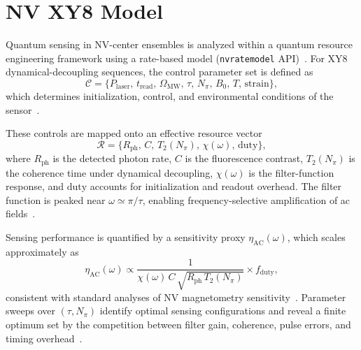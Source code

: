 \section{NV XY8 Model}

Quantum sensing in NV-center ensembles is analyzed within a quantum resource engineering framework using a rate-based model (\texttt{nvratemodel} API)~\cite{NVRateModel2023,Degen2017,Barry2020}. For XY8 dynamical-decoupling sequences, the control parameter set is defined as
\begin{equation}
\mathcal{C} = \{P_{\mathrm{laser}},\, t_{\mathrm{read}},\, \Omega_{\mathrm{MW}},\, \tau,\, N_{\pi},\, B_0,\, T,\, \mathrm{strain}\},
\end{equation}
which determines initialization, control, and environmental conditions of the sensor~\cite{Casola2018}.

These controls are mapped onto an effective resource vector
\begin{equation}
\mathcal{R} = \{R_{\mathrm{ph}},\, C,\, T_2(N_{\pi}),\, \chi(\omega),\, \mathrm{duty}\},
\end{equation}
where $R_{\mathrm{ph}}$ is the detected photon rate, $C$ is the fluorescence contrast, $T_2(N_{\pi})$ is the coherence time under dynamical decoupling, $\chi(\omega)$ is the filter-function response, and $\mathrm{duty}$ accounts for initialization and readout overhead. The filter function is peaked near $\omega \simeq \pi/\tau$, enabling frequency-selective amplification of ac fields~\cite{Cywinski2008}.

Sensing performance is quantified by a sensitivity proxy $\eta_{\mathrm{AC}}(\omega)$, which scales approximately as
\begin{equation}
\eta_{\mathrm{AC}}(\omega) \propto \frac{1}{\chi(\omega)\,C\,\sqrt{R_{\mathrm{ph}}\,T_2(N_{\pi})}} \times f_{\mathrm{duty}},
\end{equation}
consistent with standard analyses of NV magnetometry sensitivity~\cite{Degen2017,Barry2020}. Parameter sweeps over $(\tau,N_{\pi})$ identify optimal sensing configurations and reveal a finite optimum set by the competition between filter gain, coherence, pulse errors, and timing overhead~\cite{Cywinski2008,Casola2018}.
